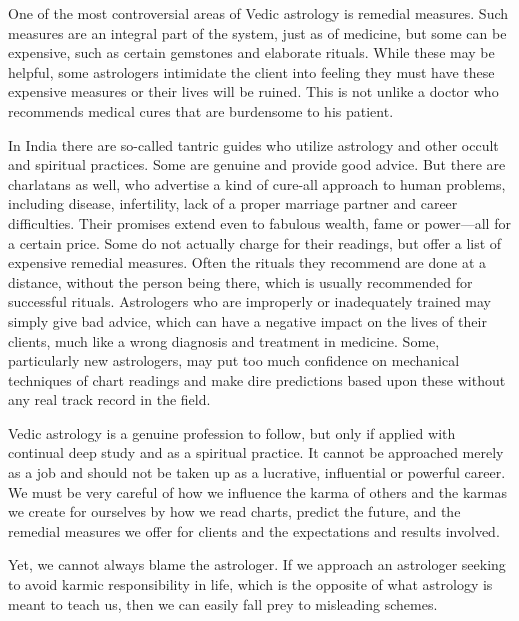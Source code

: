  

One of the most controversial areas of Vedic astrology is remedial measures. Such measures are an integral part of the system, just as of medicine, but some can be expensive, such as certain gemstones and elaborate rituals. While these may be helpful, some astrologers intimidate the client into feeling they must have these expensive measures or their lives will be ruined. This is not unlike a doctor who recommends medical cures that are burdensome to his patient.

 

In India there are so-called tantric guides who utilize astrology and other occult and spiritual practices. Some are genuine and provide good advice. But there are charlatans as well, who advertise a kind of cure-all approach to human problems, including disease, infertility, lack of a proper marriage partner and career difficulties. Their promises extend even to fabulous wealth, fame or power—all for a certain price. Some do not actually charge for their readings, but offer a list of expensive remedial measures. Often the rituals they recommend are done at a distance, without the person being there, which is usually recommended for successful rituals. Astrologers who are improperly or inadequately trained may simply give bad advice, which can have a negative impact on the lives of their clients, much like a wrong diagnosis and treatment in medicine. Some, particularly new astrologers, may put too much confidence on mechanical techniques of chart readings and make dire predictions based upon these without any real track record in the field.

 

Vedic astrology is a genuine profession to follow, but only if applied with continual deep study and as a spiritual practice. It cannot be approached merely as a job and should not be taken up as a lucrative, influential or powerful career. We must be very careful of how we influence the karma of others and the karmas we create for ourselves by how we read charts, predict the future, and the remedial measures we offer for clients and the expectations and results involved.

 

Yet, we cannot always blame the astrologer. If we approach an astrologer seeking to avoid karmic responsibility in life, which is the opposite of what astrology is meant to teach us, then we can easily fall prey to misleading schemes.

 

